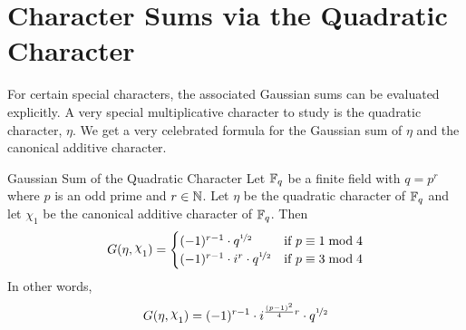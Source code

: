 \section{Character Sums via the Quadratic Character}\label{sec:quadratic-char}
For certain special characters, the associated Gaussian sums can be evaluated explicitly. A very special multiplicative character to study is the quadratic character, $\eta$. We get a very celebrated formula for the Gaussian sum of $\eta$ and the canonical additive character. 
\begin{Theorem}{Gaussian Sum of the Quadratic Character}{}
  Let $\mathbb{F}_q$ be a finite field with $q=p^r$ where $p$ is an odd prime and $r\in\mathbb{N}$. Let $\eta$ be the quadratic character of $\mathbb{F}_q$ and let $\chi_1$ be the canonical additive character of $\mathbb{F}_q$. Then $$G(\eta,\chi_1)=\begin{cases}
    (-1)^{r-1}\cdot q^{\nicefrac12} & \text{if }p\equiv 1\bmod 4\\ 
    (-1)^{r-1}\cdot i^{r}\cdot q^{\nicefrac12} & \text{if }p\equiv 3\bmod 4    
  \end{cases}$$
  In other words, $$G(\eta,\chi_1)=(-1)^{r-1}\cdot i^{\frac{(p-1)^2}4 r} \cdot q^{\nicefrac12}$$ 
\end{Theorem}
